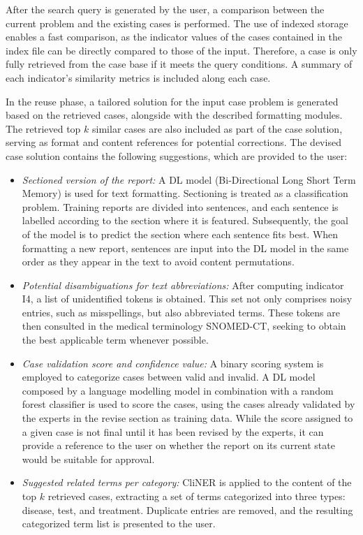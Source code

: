 After the search query is generated by the user, a comparison between the current problem and the existing cases is performed. The use of indexed storage enables a fast comparison, as the indicator values of the cases contained in the index file can be directly compared to those of the input. Therefore, a case is only fully retrieved from the case base if it meets the query conditions. A summary of each indicator's similarity metrics is included along each case. 

In the reuse phase, a tailored solution for the input case problem is generated based on the retrieved cases, alongside with the described formatting modules. The retrieved top $k$ similar cases are also included as part of the case solution, serving as format and content references for potential corrections. The devised case solution contains the following suggestions, which are provided to the user:
\begin{itemize}
    \item \textit{Sectioned version of the report:} A DL model (Bi-Directional Long Short Term Memory) is used for text formatting. Sectioning is treated as a classification problem. Training reports are divided into sentences, and each sentence is labelled according to the section where it is featured. Subsequently, the goal of the model is to predict the section where each sentence fits best. When formatting a new report, sentences are input into the DL model in the same order as they appear in the text to avoid content permutations.
    
    \item \textit{Potential disambiguations for text abbreviations:} After computing indicator I4, a list of unidentified tokens is obtained. This set not only comprises noisy entries, such as misspellings, but also abbreviated terms. These tokens are then consulted in the medical terminology SNOMED-CT, seeking to obtain the best applicable term whenever possible.
    
    \item \textit{Case validation score and confidence value:} A binary scoring system is employed to categorize cases between valid and invalid. A DL model composed by a language modelling model in combination with a random forest classifier is used to score the cases, using the cases already validated by the experts in the revise section as training data. While the score assigned to a given case is not final until it has been revised by the experts, it can provide a reference to the user on whether the report on its current state would be suitable for approval. 
    
    \item \textit{Suggested related terms per category:} CliNER is applied to the content of the top $k$ retrieved cases, extracting a set of terms categorized into three types: disease, test, and treatment. Duplicate entries are removed, and the resulting categorized term list is presented to the user.
\end{itemize}

